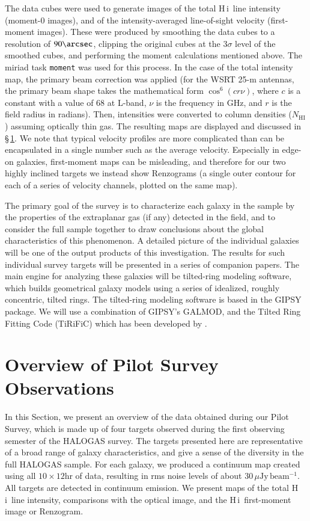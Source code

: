 \documentclass[oldversion]{aa}
\newcommand{\HI}{{\sc H\,i}}
\begin{document}
The data cubes were used to generate images of the total \HI\ line intensity (moment-0 images), and of the intensity-averaged line-of-sight velocity (first-moment images). These were produced by smoothing the data cubes to a resolution of $90\arcsec$, clipping the original cubes at the $3\sigma$ level of the smoothed cubes, and performing the moment calculations mentioned above. The miriad task {\tt moment} was used for this process. In the case of the total intensity map, the primary beam correction was applied (for the WSRT 25-m antennas, the primary beam shape takes the mathematical form $\cos^6(cr\nu)$, where $c$ is a constant with a value of 68 at L-band, $\nu$ is the frequency in GHz, and $r$ is the field radius in radians). Then, intensities were converted to column densities ($N_{\mathrm{HI}}$) assuming optically thin gas. The resulting maps are displayed and discussed in \S\,\ref{section:results}. We note that typical velocity profiles are more complicated than can be encapsulated in a single number such as the average velocity. Especially in edge-on galaxies, first-moment maps can be misleading, and therefore for our two highly inclined targets we instead show Renzograms (a single outer contour for each of a series of velocity channels, plotted on the same map).

The primary goal of the survey is to characterize each galaxy in the sample by the properties of the extraplanar gas (if any) detected in the field, and to consider the full sample together to draw conclusions about the global characteristics of this phenomenon. A detailed picture of the individual galaxies will be one of the output products of this investigation. The results for such individual survey targets will be presented in a series of companion papers. The main engine for analyzing these galaxies will be tilted-ring modeling software, which builds geometrical galaxy models using a series of idealized, roughly concentric, tilted rings. The tilted-ring modeling software is based in the GIPSY package. We will use a combination of GIPSY's GALMOD, and the Tilted Ring Fitting Code (TiRiFiC) which has been developed by \citet{jozsa_etal_2007}.

\section{Overview of Pilot Survey Observations}\label{section:results}

In this Section, we present an overview of the data obtained during our Pilot Survey, which is made up of four targets observed during the first observing semester of the HALOGAS survey. The targets presented here are representative of a broad range of galaxy characteristics, and give a sense of the diversity in the full HALOGAS sample. For each galaxy, we produced a continuum map created using all $10\times12$hr of data, resulting in rms noise levels of about $30\,\mu\mathrm{Jy\,beam^{-1}}$. All targets are detected in continuum emission. We present maps of the total \HI\ line intensity, comparisons with the optical image, and the \HI\ first-moment image or Renzogram.
\end{document}
